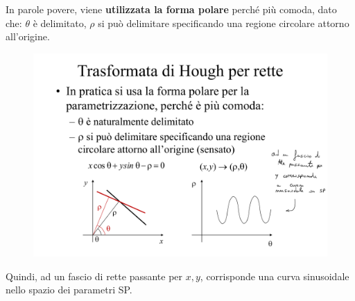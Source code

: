 \documentclass[a4paper]{article}
\begin{document}
	\noindent
	In parole povere, viene \textbf{utilizzata la forma polare} perché più comoda, dato che: $\theta$ è delimitato, $\rho$ si può delimitare specificando una regione circolare attorno all'origine.
	\begin{figure}[!htp]
		\centering
		\includegraphics[width=.6\textwidth]{img/trasformata_hough_rette_polare.pdf}
	\end{figure}

	\noindent
	Quindi, ad un fascio di rette passante per $x,y$, corrisponde una curva sinusoidale nello spazio dei parametri SP.\newline
	
\end{document}
